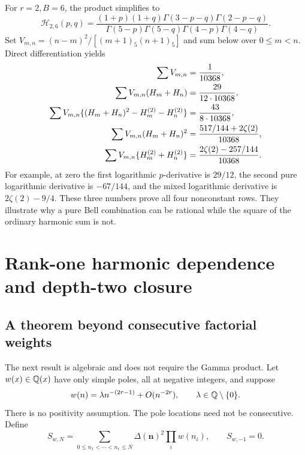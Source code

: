 \documentclass[11pt,letterpaper]{article}
\numberwithin{equation}{section}
\theoremstyle{definition}\newtheorem{definition}[theorem]{Definition}
\theoremstyle{remark}\newtheorem{remark}[theorem]{Remark}
\begin{document}
For $r=2,B=6$, the product simplifies to
\begin{equation}\label{dhr:eq:H26}
 \mathcal H_{2,6}(p,q)=
 \frac{(1+p)(1+q)\Gamma(3-p-q)\Gamma(2-p-q)}
 {\Gamma(5-p)\Gamma(5-q)\Gamma(4-p)\Gamma(4-q)}.
\end{equation}
Set $V_{m,n}=(n-m)^2/[(m+1)_5(n+1)_5]$ and sum below over
$0\leq m<n$. Direct differentiation yields
\begin{align}
 \sum V_{m,n}&=\frac1{10368},\notag\\
 \sum V_{m,n}(H_m+H_n)&=\frac{29}{12\cdot10368},\notag\\
 \sum V_{m,n}\{(H_m+H_n)^2-H_m^{(2)}-H_n^{(2)}\}
 &=\frac{43}{8\cdot10368},\notag\\
 \sum V_{m,n}(H_m+H_n)^2
 &=\frac{517/144+2\zeta(2)}{10368},\notag\\
 \sum V_{m,n}\{H_m^{(2)}+H_n^{(2)}\}
 &=\frac{2\zeta(2)-257/144}{10368}.
 \label{dhr:eq:ordinary-examples}
\end{align}
For example, at zero the first logarithmic $p$-derivative is $29/12$,
the second pure logarithmic derivative is $-67/144$, and the mixed
logarithmic derivative is $2\zeta(2)-9/4$. These three numbers prove
all four nonconstant rows. They illustrate why a pure Bell combination
can be rational while the square of the ordinary harmonic sum is not.


\section{Rank-one harmonic dependence and depth-two closure}
\label{dhr:sec:depth}

\subsection{A theorem beyond consecutive factorial weights}
The next result is algebraic and does not require the Gamma product.
Let $w(x)\in\mathbb Q(x)$ have only simple poles, all at negative integers,
and suppose
\begin{equation}\label{dhr:eq:rational-weight-assumption}
 w(n)=\lambda n^{-(2r-1)}+O(n^{-2r}),\qquad
 \lambda\in\mathbb Q\setminus\{0\}.
\end{equation}
There is no positivity assumption. The pole locations need not be
consecutive. Define
\begin{equation}\label{dhr:eq:general-cutoff}
 S_{w,N}=\sum_{0\leq n_1<\cdots<n_r\leq N}
              \Delta(\bm n)^2\prod_iw(n_i),\qquad S_{w,-1}=0.
\end{equation}
\end{document}
